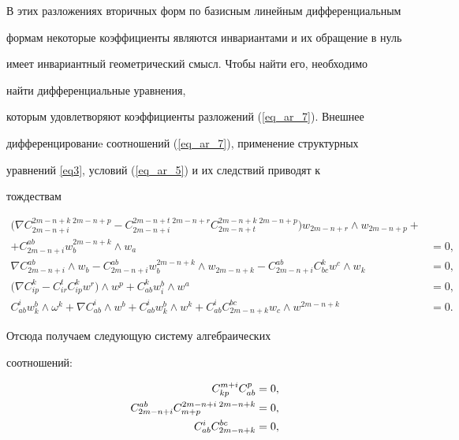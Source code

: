 В этих разложениях вторичных форм по базисным линейным дифференциальным


формам некоторые коэффициенты являются инвариантами и их обращение в нуль


имеет инвариантный геометрический смысл. Чтобы найти его, необходимо


найти дифференциальные уравнения,


которым удовлетворяют коэффициенты разложений (\ref{eq_ar_7}). Внешнее


дифференцированиe соотношений (\ref{eq_ar_7}), применение структурных


уравнений \eqref{eq3}, условий (\ref{eq_ar_5}) и их следствий приводят к


тождествам


\begin{align*}


\big(\nabla C^{2m-n+k\; 2m-n+p}_{2m-n+i}- C^{2m-n+t\; 2m-n+r}_{2m-


n+i}C^{2m-n+k\; 2m-n+p}_{2m-n+t}\big)w_{2m-n+r}\wedge w_{2m-n+p}+&\qquad \\


+C^{ab}_{2m-n+i}w_b^{2m-n+k}\wedge w_a&=0,\\


%


\nabla C^{ab}_{2m-n+i}\wedge w_b-C^{ab}_{2m-n+i}w^{2m-n+k}_b\wedge w_{2m-


n+k}-C^{ab}_{2m-n+i}C^k_{bc}w^c\wedge w_k&=0,\\


%


\big(\nabla C^k_{ip}-C^t_{ir}C^k_{ip}w^r\big)\wedge


w^p+C^k_{ab}w^b_i\wedge w^a&=0,\\


%


C^i_{ab}w^b_k\wedge\omega^k+\nabla C^i_{ab}\wedge w^b+C^i_{ab}w^b_k\wedge w^k


+C^i_{ab}C^{bc}_{2m-n+k}w_c\wedge w^{2m-n+k}&=0.


\end{align*}


Отсюда получаем следующую систему алгебраических


соотношений:


\begin{align}


C^{m+i}_{kp}C^p_{ab}&=0,\notag \\


%


\label{eq_ar_9}


C^{ab}_{2m-n+i}C^{2m-n+i\;2m-n+k}_{m+p}&=0,\\


%


C^i_{ab}C^{bc}_{2m-n+k}&=0,\notag


\end{align}


